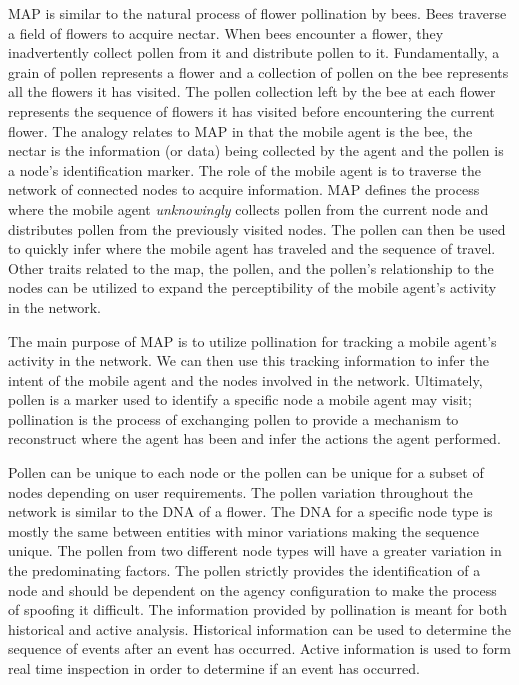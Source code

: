\documentclass{acm_proc_article-sp}
\begin{document}
MAP is similar to the natural process of flower pollination by bees.  Bees traverse a field of flowers to acquire nectar.  When bees encounter a flower, they inadvertently collect pollen from it and distribute pollen to it.  Fundamentally, a grain of pollen represents a flower and a collection of pollen on the bee represents all the flowers it has visited.  The pollen collection left by the bee at each flower represents the sequence of flowers it has visited before encountering the current flower.  The analogy relates to MAP in that the mobile agent is the bee, the nectar is the information (or data) being collected by the agent and the pollen is a node's identification marker.  The role of the mobile agent is to traverse the network of connected nodes to acquire information.  MAP defines the process where the mobile agent {\it unknowingly} collects pollen from the current node and distributes pollen from the previously visited nodes.  The pollen can then be used to quickly infer where the mobile agent has traveled and the sequence of travel.  Other traits related to the map, the pollen, and the pollen's relationship to the nodes can be utilized to expand the perceptibility of the mobile agent's activity in the network.

The main purpose of MAP is to utilize pollination for tracking a mobile agent's activity in the network.  We can then use this tracking information to infer the intent of the mobile agent and the nodes involved in the network.  Ultimately, pollen is a marker used to identify a specific node a mobile agent may visit; pollination is the process of exchanging pollen to provide a mechanism to reconstruct where the agent has been and infer the actions the agent performed.

Pollen can be unique to each node or the pollen can be unique for a subset of nodes depending on user requirements.  The pollen variation throughout the network is similar to the DNA of a flower.  The DNA for a specific node type is mostly the same between entities with minor variations making the sequence unique.  The pollen from two different node types will have a greater variation in the predominating factors.  The pollen strictly provides the identification of a node and should be dependent on the agency configuration to make the process of spoofing it difficult.  The information provided by pollination is meant for both historical and active analysis.  Historical information can be used to determine the sequence of events after an event has occurred.  Active information is used to form real time inspection in order to determine if an event has occurred.
\end{document}
